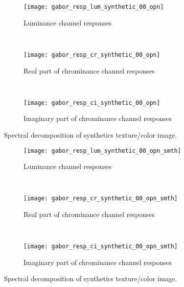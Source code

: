     	    


\begin{figure}[!ht]
    \centering
    \begin{subfigure}[b]{\textwidth}
        \texttt{[image: gabor\_resp\_lum\_synthetic\_00\_opn]}
        \caption{Luminance channel responses}
    \end{subfigure} \\    
    \begin{subfigure}[b]{\textwidth}
    	\texttt{[image: gabor\_resp\_cr\_synthetic\_00\_opn]}
        \caption{Real part of chrominance channel responses}
    \end{subfigure} \\    	
    \begin{subfigure}[b]{\textwidth}
        \texttt{[image: gabor\_resp\_ci\_synthetic\_00\_opn]}
        \caption{Imaginary part of chrominance channel responses}
    \end{subfigure} 
    	    
    \caption{Spectral decomposition of synthetics texture/color image.}\label{fig:synthetic_img_gresponses}    
\end{figure}

\begin{figure}[!ht]
    \centering
    \begin{subfigure}[b]{\textwidth}
        \texttt{[image: gabor\_resp\_lum\_synthetic\_00\_opn\_smth]}
        \caption{Luminance channel responses}
    \end{subfigure} \\    
    \begin{subfigure}[b]{\textwidth}
    	\texttt{[image: gabor\_resp\_cr\_synthetic\_00\_opn\_smth]}
        \caption{Real part of chrominance channel responses}
    \end{subfigure} \\    	
    \begin{subfigure}[b]{\textwidth}
        \texttt{[image: gabor\_resp\_ci\_synthetic\_00\_opn\_smth]}
        \caption{Imaginary part of chrominance channel responses}
    \end{subfigure} 
    	    
    \caption{Spectral decomposition of synthetics texture/color image.}\label{fig:synthetic_img_gresponses}    
\end{figure}



